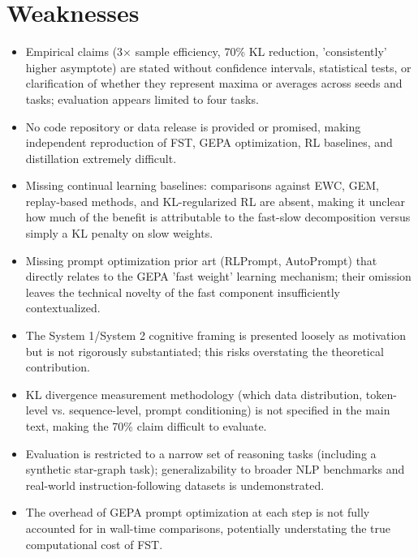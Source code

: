 \documentclass[11pt]{article}
\begin{document}
\section*{Weaknesses}
\begin{itemize}[leftmargin=*]
  \item Empirical claims (3× sample efficiency, 70\% KL reduction, 'consistently' higher asymptote) are stated without confidence intervals, statistical tests, or clarification of whether they represent maxima or averages across seeds and tasks; evaluation appears limited to four tasks.
  \item No code repository or data release is provided or promised, making independent reproduction of FST, GEPA optimization, RL baselines, and distillation extremely difficult.
  \item Missing continual learning baselines: comparisons against EWC, GEM, replay-based methods, and KL-regularized RL are absent, making it unclear how much of the benefit is attributable to the fast-slow decomposition versus simply a KL penalty on slow weights.
  \item Missing prompt optimization prior art (RLPrompt, AutoPrompt) that directly relates to the GEPA 'fast weight' learning mechanism; their omission leaves the technical novelty of the fast component insufficiently contextualized.
  \item The System 1/System 2 cognitive framing is presented loosely as motivation but is not rigorously substantiated; this risks overstating the theoretical contribution.
  \item KL divergence measurement methodology (which data distribution, token-level vs. sequence-level, prompt conditioning) is not specified in the main text, making the 70\% claim difficult to evaluate.
  \item Evaluation is restricted to a narrow set of reasoning tasks (including a synthetic star-graph task); generalizability to broader NLP benchmarks and real-world instruction-following datasets is undemonstrated.
  \item The overhead of GEPA prompt optimization at each step is not fully accounted for in wall-time comparisons, potentially understating the true computational cost of FST.
\end{itemize}
\end{document}
